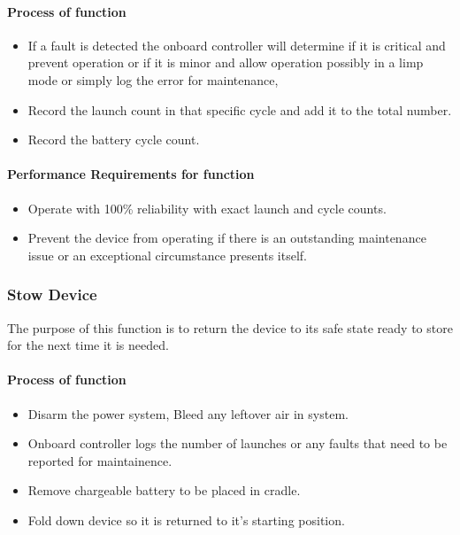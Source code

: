 \documentclass[a4paper,10pt]{article}
\begin{document}
\paragraph{Process of function}

\begin{itemize}
    \item If a fault is detected the onboard controller will determine if it is critical and prevent operation or if it is minor and allow operation possibly in a limp mode or simply log the error for maintenance,
    \item Record the launch count in that specific cycle and add it to the total number.
    \item Record the battery cycle count.
\end{itemize}

\paragraph{Performance Requirements for function}

\begin{itemize}
    \item Operate with 100\% reliability with exact launch and cycle counts.
    \item Prevent the device from operating if there is an outstanding maintenance issue or an exceptional circumstance presents itself.
\end{itemize}





\subsubsection{Stow Device}

The purpose of this function is to return the device to its safe state ready to store for the next time it is needed.

\paragraph{Process of function}


\begin{itemize}
    \item Disarm the power system, Bleed any leftover air in system.
    \item Onboard controller logs the number of launches or any faults that need to be reported for maintainence.
    \item Remove chargeable battery to be placed in cradle.
    \item Fold down device so it is returned to it's starting position.
\end{itemize}
\end{document}
